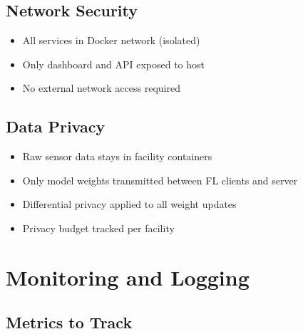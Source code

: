 \documentclass[12pt,a4paper]{article}
\begin{document}
\subsection{Network Security}

\begin{itemize}[leftmargin=1cm,itemsep=0pt]
    \item All services in Docker network (isolated)
    \item Only dashboard and API exposed to host
    \item No external network access required
\end{itemize}

\subsection{Data Privacy}

\begin{itemize}[leftmargin=1cm,itemsep=0pt]
    \item Raw sensor data stays in facility containers
    \item Only model weights transmitted between FL clients and server
    \item Differential privacy applied to all weight updates
    \item Privacy budget tracked per facility
\end{itemize}


\section{Monitoring and Logging}

\subsection{Metrics to Track}
\end{document}
